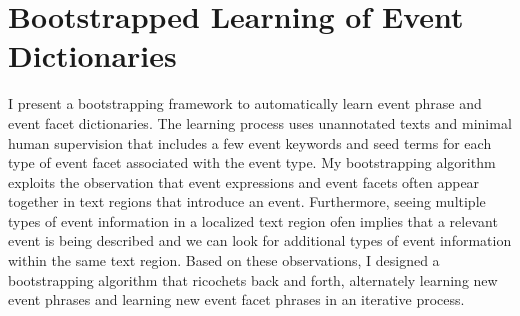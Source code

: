 

\section{Bootstrapped Learning of Event Dictionaries}
\label{bootstrapping-cu}
I present a bootstrapping framework to
automatically learn event phrase 
and event facet 
 dictionaries. 
The learning process uses unannotated texts and minimal human supervision 
that includes a few event
keywords and seed terms for 
each type of event facet 
associated with the event type. 
My bootstrapping algorithm exploits the observation that event expressions 
and event facets often appear together in  text regions that 
introduce an event.  
Furthermore, seeing multiple types of event information in a 
localized 
text region ofen implies that a relevant event is being described 
and we can look for additional types of event information 
within the same text region.
Based on 
these observations, I designed a bootstrapping algorithm 
that ricochets back and forth, alternately 
learning new event phrases and learning new 
event facet phrases in
an iterative process. 


